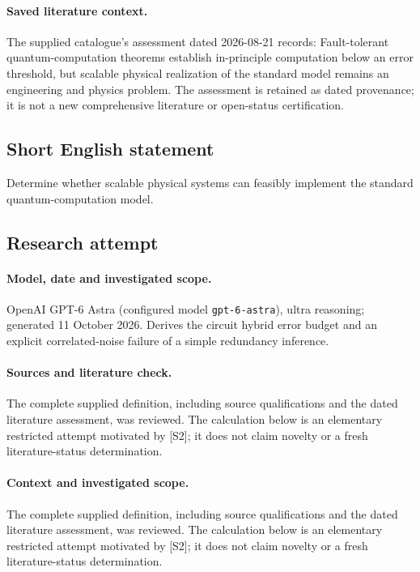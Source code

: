 \documentclass[11pt]{article}
\begin{document}
\paragraph{Saved literature context.} The supplied catalogue's assessment dated 2026-08-21 records: Fault-tolerant quantum-computation theorems establish in-principle computation below an error threshold, but scalable physical realization of the standard model remains an engineering and physics problem. The assessment is retained as dated provenance; it is not a new comprehensive literature or open-status certification.
\subsection{Short English statement}
Determine whether scalable physical systems can feasibly implement the standard quantum-computation model.
\subsection{Research attempt}
\paragraph{Model, date and investigated scope.}
OpenAI GPT-6 Astra (configured model \texttt{gpt-6-astra}), ultra reasoning; generated 11 October 2026. Derives the circuit hybrid error budget and an explicit correlated-noise failure of a simple redundancy inference.

\paragraph{Sources and literature check.}
The complete supplied definition, including source qualifications and the dated literature assessment, was reviewed. The calculation below is an elementary restricted attempt motivated by [S2]; it does not claim novelty or a fresh literature-status determination.

\paragraph{Context and investigated scope.} The complete supplied definition, including source qualifications and the dated literature assessment, was reviewed. The calculation below is an elementary restricted attempt motivated by [S2]; it does not claim novelty or a fresh literature-status determination.
\end{document}
